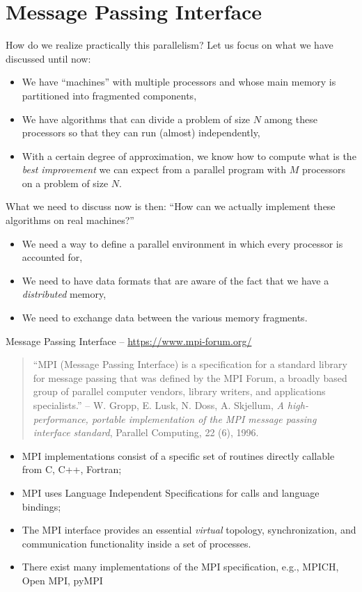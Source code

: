 \documentclass{beamer}
\begin{document}
\section{Message Passing Interface}

\begin{frame}{How do we realize practically this parallelism?}
Let us focus on what we have discussed until now:
\begin{itemize}
	\item We have ``machines'' with multiple processors and whose main memory is partitioned into fragmented components,
	\item We have algorithms that can divide a problem of size $N$ among these processors so that they can run (almost) independently,
	\item With a certain degree of approximation, we know how to compute what is the \emph{best improvement} we can expect from a parallel program with $M$ processors on a problem of size $N$.
\end{itemize}
What we need to discuss now is then: ``How can we actually implement these algorithms on real machines?''
\begin{itemize}
	\item We need a way to define a parallel environment in which every processor is accounted for,
	\item We need to have data formats that are aware of the fact that we have a \emph{distributed} memory,
	\item We need to exchange data between the various memory fragments.
\end{itemize}
\end{frame}

\begin{frame}{Message Passing Interface -- \url{https://www.mpi-forum.org/}}

\begin{quote}
	``MPI (Message Passing Interface) is a \alert{specification for a standard library} for message passing that was defined by the MPI Forum, a broadly based group of parallel computer vendors, library writers, and applications specialists.'' -- W. Gropp, E. Lusk, N. Doss, A. Skjellum,
	\emph{A high-performance, portable implementation of the MPI message passing interface standard}, Parallel Computing, 22 (6), 1996.
\end{quote}

\begin{itemize}
	\item<2-> MPI implementations consist of a specific set of routines directly callable from C, C++, Fortran;
	\item<3-> MPI uses Language Independent Specifications for calls and language bindings;
	\item<4-> The MPI interface provides an essential \emph{virtual} topology, synchronization, and communication functionality inside a set of processes.
	\item<5-> There exist many implementations of the MPI specification, e.g., MPICH, Open MPI, pyMPI
\end{itemize}
\end{frame}
\end{document}
